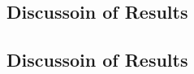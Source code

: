 \documentclass[a4paper]{article}
\begin{document}
\subsection{Discussoin of Results}


\subsection{Discussoin of Results}






\end{document}
